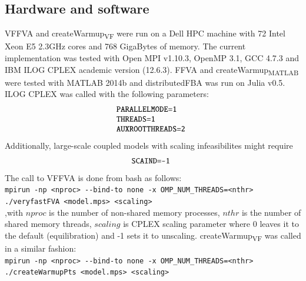 \documentclass[8pt,a4paper]{book}
\begin{document}
\subsection*{Hardware and software}
VFFVA and createWarmup\textsubscript{VF} were run on a Dell HPC machine with 72 Intel Xeon E5 2.3GHz cores and 768 GigaBytes of memory. The current implementation was tested with Open MPI v1.10.3, OpenMP 3.1, GCC 4.7.3 and IBM ILOG CPLEX academic version (12.6.3). FFVA and createWarmup\textsubscript{MATLAB} were tested with MATLAB 2014b \cite{MATLAB:2014} and distributedFBA was run on Julia v0.5. ILOG CPLEX was called with the following parameters:
\begin{equation*} \label{eq:one}
\begin{array}{ll@{}ll}
\texttt{PARALLELMODE=1} &\\
\texttt{THREADS=1} &\\
\texttt{AUXROOTTHREADS=2} &\\
\end{array}
\end{equation*}
Additionally, large-scale coupled models with scaling infeasibilites might require 
\begin{equation*} \label{eq:one}
\begin{array}{ll@{}ll}
\texttt{SCAIND=-1} &\\
\end{array}
\end{equation*}
The call to VFFVA is done from bash as follows:\\
\texttt{mpirun -np \textless nproc\textgreater \hspace{0.1cm} -\hspace{0.05cm}-bind-to none -x OMP\_NUM\_THREADS=\textless nthr\textgreater \hspace{0.1cm} ./veryfastFVA \textless model.mps\textgreater \hspace{0.1cm} \textless scaling\textgreater}\\
,with $nproc$ is the number of non-shared memory processes, $nthr$ is the number of shared memory threads, $scaling$ is CPLEX scaling parameter where 0 leaves it to the default (equilibration) and -1 sets it to unscaling. createWarmup\textsubscript{VF} was called in a similar fashion:\\
\texttt{mpirun -np \textless nproc\textgreater \hspace{0.1cm}  -\hspace{0.05cm}-bind-to none -x OMP\_NUM\_THREADS=\textless nthr\textgreater \hspace{0.1cm}\\ ./createWarmupPts \textless model.mps\textgreater \hspace{0.1cm} \textless scaling\textgreater}\\
\end{document}
